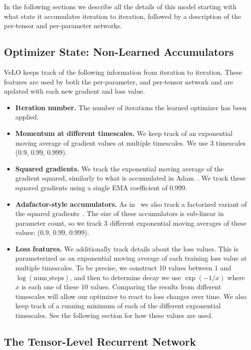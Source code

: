 \documentclass[11pt]{article}
\begin{document}
In the following sections we describe all the details of this model starting with what state it accumulates iteration to iteration, followed by a description of the per-tensor and per-parameter networks.

\subsection{Optimizer State: Non-Learned Accumulators}
VeLO keeps track of the following information from iteration to iteration. These features are used by both the per-parameter, and per-tensor network and are updated with each new gradient and loss value.

\begin{itemize}
    \item \textbf{Iteration number.} The number of iterations the learned optimizer has been applied.
    \item \textbf{Momentum at different timescales.} We keep track of an exponential moving average of gradient values at multiple timescales. We use 3 timescales (0.9, 0.99, 0.999).
    \item \textbf{Squared gradients.} We track the exponential moving average of the gradient squared, similarly to what is accumulated in Adam~\citep{kingma2014adam}. We track these squared gradients using a single EMA coefficient of 0.999.
    \item \textbf{Adafactor-style accumulators.} As in~\citet{metz2022practical} we also track a factorized variant of the squared gradients~\citep{shazeer2018adafactor}. The size of these accumulators is sub-linear in parameter count, so we track 3 different exponential moving averages of these values: (0.9, 0.99, 0.999).
    \item \textbf{Loss features.} We additionally track details about the loss values. This is parameterized as an exponential moving average of each training loss value at multiple timescales. To be precise, we construct 10 values between $1$ and $ \log(\text{num\_steps})$, and then to determine decay we use $\exp(-1/x)$ where $x$ is each one of these 10 values. Comparing the results from different timescales will allow our optimizer to react to loss changes over time. We also keep track of a running minimum of each of the different exponential timescales. See the following section for how these values are used. 
\end{itemize}


\subsection{The Tensor-Level Recurrent Network}
\end{document}
